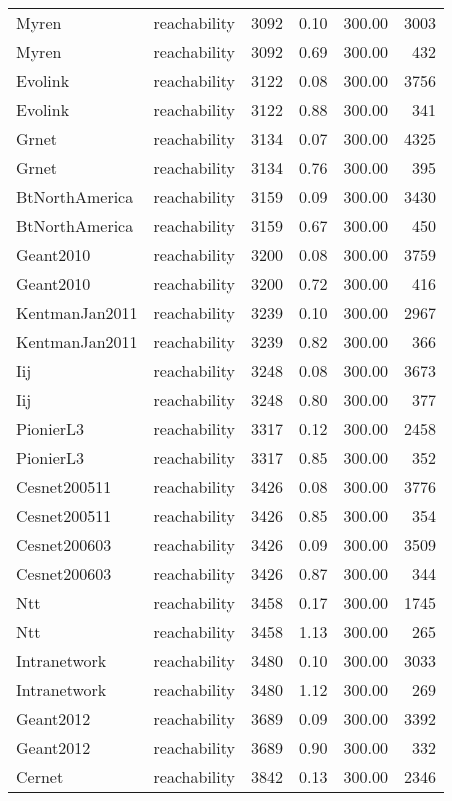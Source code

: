 \begin{tabular}{llrrrr}
Myren & reachability & 3092 & 0.10 & 300.00 & 3003 \\
Myren & reachability & 3092 & 0.69 & 300.00 & 432 \\
Evolink & reachability & 3122 & 0.08 & 300.00 & 3756 \\
Evolink & reachability & 3122 & 0.88 & 300.00 & 341 \\
Grnet & reachability & 3134 & 0.07 & 300.00 & 4325 \\
Grnet & reachability & 3134 & 0.76 & 300.00 & 395 \\
BtNorthAmerica & reachability & 3159 & 0.09 & 300.00 & 3430 \\
BtNorthAmerica & reachability & 3159 & 0.67 & 300.00 & 450 \\
Geant2010 & reachability & 3200 & 0.08 & 300.00 & 3759 \\
Geant2010 & reachability & 3200 & 0.72 & 300.00 & 416 \\
KentmanJan2011 & reachability & 3239 & 0.10 & 300.00 & 2967 \\
KentmanJan2011 & reachability & 3239 & 0.82 & 300.00 & 366 \\
Iij & reachability & 3248 & 0.08 & 300.00 & 3673 \\
Iij & reachability & 3248 & 0.80 & 300.00 & 377 \\
PionierL3 & reachability & 3317 & 0.12 & 300.00 & 2458 \\
PionierL3 & reachability & 3317 & 0.85 & 300.00 & 352 \\
Cesnet200511 & reachability & 3426 & 0.08 & 300.00 & 3776 \\
Cesnet200511 & reachability & 3426 & 0.85 & 300.00 & 354 \\
Cesnet200603 & reachability & 3426 & 0.09 & 300.00 & 3509 \\
Cesnet200603 & reachability & 3426 & 0.87 & 300.00 & 344 \\
Ntt & reachability & 3458 & 0.17 & 300.00 & 1745 \\
Ntt & reachability & 3458 & 1.13 & 300.00 & 265 \\
Intranetwork & reachability & 3480 & 0.10 & 300.00 & 3033 \\
Intranetwork & reachability & 3480 & 1.12 & 300.00 & 269 \\
Geant2012 & reachability & 3689 & 0.09 & 300.00 & 3392 \\
Geant2012 & reachability & 3689 & 0.90 & 300.00 & 332 \\
Cernet & reachability & 3842 & 0.13 & 300.00 & 2346 \\

\end{tabular}
